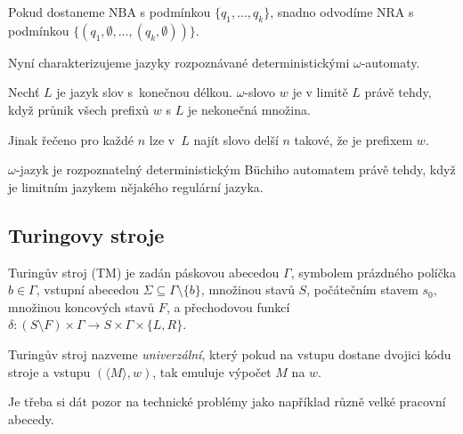 Pokud dostaneme NBA s podmínkou $\{q_1, \ldots, q_k\}$,
snadno odvodíme NRA s podmínkou $\{(q_1, \emptyset, \ldots, (q_k, \emptyset))\}$.

\begin{example}
\end{example}

Nyní charakterizujeme jazyky rozpoznávané deterministickými $\omega$-automaty.

\begin{definition}
    Nechť $L$ je jazyk slov s~konečnou délkou.
    $\omega$-slovo $w$ je v limitě $L$ právě tehdy,
    když průnik všech prefixů $w$ s $L$ je nekonečná množina.
\end{definition}

Jinak řečeno pro každé $n$ lze v~$L$ najít slovo delší $n$ takové, že
je prefixem $w$.

\begin{theorem}
$\omega$-jazyk je rozpoznatelný deterministickým Büchiho automatem
právě tehdy, když je limitním jazykem nějakého regulární jazyka.
\end{theorem}


\subsection{Turingovy stroje}

\begin{definition}
    Turingův stroj (TM) je zadán
    páskovou abecedou $\Gamma$,
    symbolem prázdného políčka $b \in \Gamma$,
    vstupní abecedou $\Sigma \subseteq \Gamma \setminus \{b\}$,
    množinou stavů $S$,
    počátečním stavem $s_0$,
    množinou koncových stavů $F$,
    a přechodovou funkcí \linebreak
    $\delta : (S \setminus F) \times \Gamma
        \to S \times \Gamma \times \{L,R\}$.
\end{definition}

\begin{definition}[Univerzální TS]
Turingův stroj nazveme {\em univerzální},
který pokud na vstupu dostane dvojici kódu stroje a vstupu
$(\langle M \rangle, w)$, tak emuluje výpočet $M$ na $w$.
\end{definition}

Je třeba si dát pozor na technické problémy jako například různě velké
pracovní abecedy.


